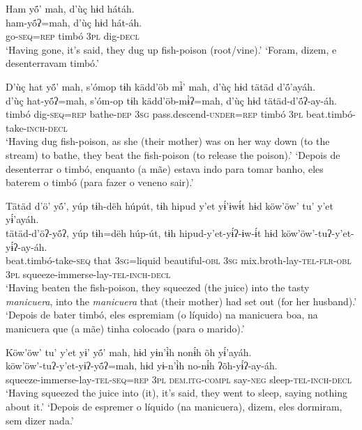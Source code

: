 \documentclass[output=paper,
modfonts,nonflat
]{langsci/langscibook}
\begin{document}
\ea  Ham yö́’ mah, d’ùç hɨd hátáh.\\ 
\gll ham-yö́ʔ=mah, d’ùç hɨd hát-áh.\\
     go\textsc{-seq=rep} timbó \textsc{3pl} dig\textsc{-decl}\\
\glt ‘Having gone, it's said, they dug up fish-poison (root/vine).'{\footnotemark}
\glt ‘Foram, dizem, e desenterravam timbó.'
\z 

\newpage
\ea  D’ùç hat yö́’ mah, s’ómop tɨh kädd’öb mɨ̀’ mah, d’ùç hɨd tätäd d’ö́’ayáh.\\ 
\gll d’ùç hat-yö́ʔ=mah, s’óm-op tɨh kädd’öb-mɨ̀ʔ=mah, d’ùç hɨd tätäd-d’ö́ʔ-ay-áh.\\
     timbó dig\textsc{-seq=rep} bathe\textsc{-dep} \textsc{3sg} pass.descend\textsc{-under=rep} timbó \textsc{3pl} beat.timbó-take\textsc{-inch-decl}\\
\glt ‘Having dug fish-poison, as she (their mother) was on her way down (to the stream) to bathe, they beat the fish-poison (to release the poison).'
\glt ‘Depois de desenterrar o timbó, enquanto (a mãe) estava indo para tomar banho, eles baterem o timbó (para fazer o veneno sair).'
\z 

\ea  Tätäd d’ö’ yö́’, yúp tɨh-dëh húpút, tɨh hipud y’et yɨ́’ɨwɨ́t hɨd köw’öw’ tu’ y’et yɨ́’ayáh.\\ 
\gll tätäd-d’öʔ-yö́ʔ, yúp tɨh=dëh húp-út, tɨh hipud-y’et-yɨ́ʔ-ɨw-ɨ́t hɨd köw’öw’-tuʔ-y’et-yɨ́ʔ-ay-áh.\\
     beat.timbó-take\textsc{-seq} that \textsc{3sg=}liquid beautiful\textsc{-obl} \textsc{3sg} mix.broth-lay\textsc{-tel-flr-obl} \textsc{3pl} squeeze-immerse-lay\textsc{-tel-inch-decl}\\
\glt ‘Having beaten the fish-poison, they squeezed (the juice) into the tasty \textit{manicuera}, into the \textit{manicuera} that (their mother) had set out (for her husband).'
\glt ‘Depois de bater timbó, eles espremiam (o líquido) na manicuera boa, na manicuera que (a mãe) tinha colocado (para o marido).'
\z 

\ea  Köw’öw’ tu’ y’et yɨ’ yö́’ mah, hɨd yɨn’ɨ̀h nonɨ́h õh yɨ́’ayáh.\\ 
\gll köw’öw’-tuʔ-y’et-yɨʔ-yö́ʔ=mah, hɨd yɨ-n’ɨ̀h no-nɨ́h ʔõh-yɨ́ʔ-ay-áh.\\
     squeeze-immerse-lay\textsc{-tel-seq=rep} \textsc{3pl} \textsc{dem.itg-compl} say\textsc{-neg} sleep\textsc{-tel-inch-decl}\\
\glt ‘Having squeezed the juice into (it), it’s said, they went to sleep, saying nothing about it.'
\glt ‘Depois de espremer o líquido (na manicuera), dizem, eles dormiram, sem dizer nada.'
\z 
\end{document}
